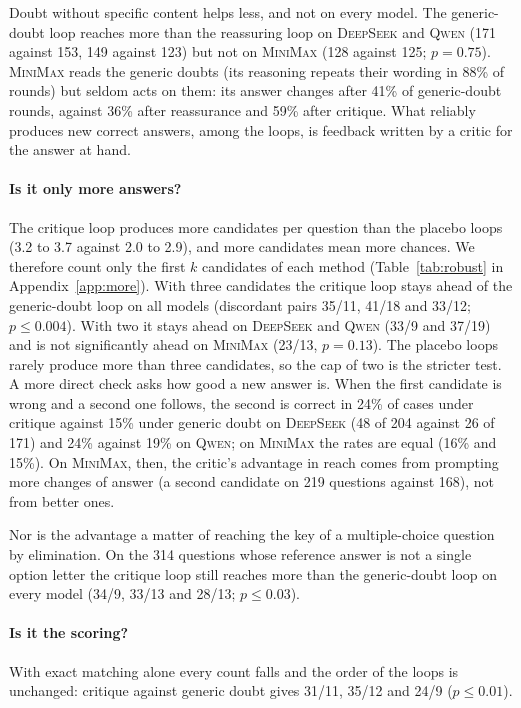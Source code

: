 \documentclass[11pt]{article}
\newcommand{\ds}{\textsc{DeepSeek}}
\newcommand{\qw}{\textsc{Qwen}}
\newcommand{\mm}{\textsc{MiniMax}}
\begin{document}
Doubt without specific content helps less, and not on every model.
The generic-doubt loop reaches more than the reassuring loop on \ds{} and \qw{} (171 against 153, 149 against 123) but not on \mm{} (128 against 125; $p=0.75$).
\mm{} reads the generic doubts (its reasoning repeats their wording in 88\% of rounds) but seldom acts on them: its answer changes after 41\% of generic-doubt rounds, against 36\% after reassurance and 59\% after critique.
What reliably produces new correct answers, among the loops, is feedback written by a critic for the answer at hand.

\paragraph{Is it only more answers?}
The critique loop produces more candidates per question than the placebo loops (3.2 to 3.7 against 2.0 to 2.9), and more candidates mean more chances.
We therefore count only the first $k$ candidates of each method (Table~\ref{tab:robust} in Appendix~\ref{app:more}).
With three candidates the critique loop stays ahead of the generic-doubt loop on all models (discordant pairs 35/11, 41/18 and 33/12; $p\le 0.004$).
With two it stays ahead on \ds{} and \qw{} (33/9 and 37/19) and is not significantly ahead on \mm{} (23/13, $p=0.13$).
The placebo loops rarely produce more than three candidates, so the cap of two is the stricter test.
A more direct check asks how good a new answer is.
When the first candidate is wrong and a second one follows, the second is correct in 24\% of cases under critique against 15\% under generic doubt on \ds{} (48 of 204 against 26 of 171) and 24\% against 19\% on \qw; on \mm{} the rates are equal (16\% and 15\%).
On \mm, then, the critic's advantage in reach comes from prompting more changes of answer (a second candidate on 219 questions against 168), not from better ones.

Nor is the advantage a matter of reaching the key of a multiple-choice question by elimination.
On the 314 questions whose reference answer is not a single option letter the critique loop still reaches more than the generic-doubt loop on every model (34/9, 33/13 and 28/13; $p\le 0.03$).

\paragraph{Is it the scoring?}
With exact matching alone every count falls and the order of the loops is unchanged: critique against generic doubt gives 31/11, 35/12 and 24/9 ($p\le 0.01$).
\end{document}
